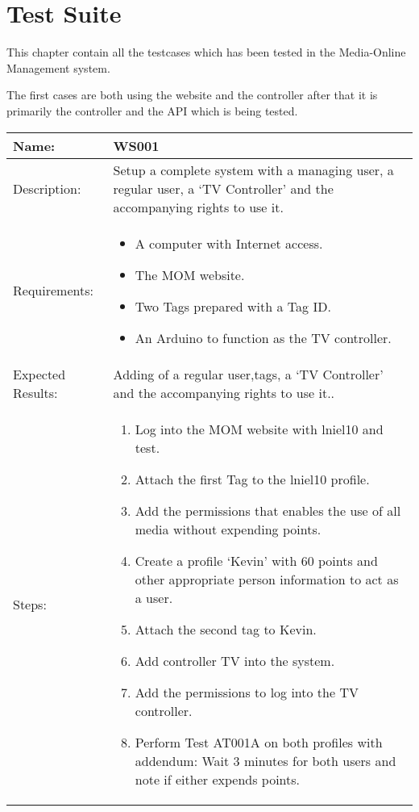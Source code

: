 \chapter{Test Suite}
\label{appen:testSuite}
This chapter contain all the testcases which has been tested in the Media-Online Management system.

The first cases are both using the website and the controller after that it is primarily the controller and the API which is being tested.
\begin{table}[h]
	\centering
		\begin{tabular}{|l|p{9cm}|}
		\hline
		\hline
		Name: & WS001\\
		\hline
		Description: & Setup a complete system with a managing user, a regular user, a `TV Controller' and the accompanying rights to use it.\\
		\hline
		Requirements: & 
		\begin{itemize}
			\item A computer with Internet access.
			\item The MOM website.
			\item Two Tags prepared with a Tag ID.
			\item An Arduino to function as the TV controller. 
		\end{itemize}
		\\
		\hline
		Expected Results: & Adding of a regular user,tags, a `TV Controller' and the accompanying rights to use it..\\
		\hline
		Steps: & 
		\begin{enumerate}
			\item Log into the MOM website with lniel10 and test.
			\item Attach the first Tag to the lniel10 profile.
			\item Add the permissions that enables the use of all media without expending points.
			\item Create a profile `Kevin' with 60 points and other appropriate person information to act as a user.
			\item Attach the second tag to Kevin.
			\item Add controller TV into the system.
			\item Add the permissions to log into the TV controller.
			\item Perform Test AT001A on both profiles with addendum: Wait 3 minutes for both users and note if either expends points.

\end{enumerate}
\end{tabular}
\end{table}
